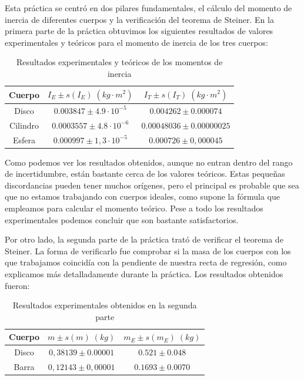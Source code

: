 \documentclass[a4paper,12pt,titlepage]{report}
\begin{document}
Esta práctica se centró en dos pilares fundamentales, el cálculo del momento de inercia de diferentes cuerpos y la verificación del teorema de Steiner. En la primera parte de la práctica obtuvimos los siguientes resultados de valores experimentales y teóricos para el momento de inercia de los tres cuerpos:

\begin{table}[h!]
    \centering
    \begin{tabular}{|c|c|c|}
        \hline
        Cuerpo & $I_E \pm s(I_E) \; (kg \cdot m^2)$ & $I_T \pm s(I_T) \; (kg \cdot m^2)$  \\ \hline
        Disco &$0.003847 \pm 4.9 \cdot 10^{-5}$ & $0.004262 \pm 0.000074$ \\ \hline
        Cilindro & $0.0003557 \pm 4.8 \cdot 10^{-6}$ & $0.00048036 \pm 0.00000025$ \\ \hline 
        Esfera & $0.000997 \pm  1,3 \cdot 10^{-5}$ & $0.000726 \pm 0,000045$ \\ \hline
    \end{tabular}
    \caption{Resultados experimentales y teóricos de los momentos de inercia}
\end{table}

Como podemos ver los resultados obtenidos, aunque no entran dentro del rango de incertidumbre, están bastante cerca de los valores teóricos. Estas pequeñas discordancias pueden tener muchos orígenes, pero el principal es probable que sea que no estamos trabajando con cuerpos ideales, como supone la fórmula que empleamos para calcular el momento teórico. Pese a todo los resultados experimentales podemos concluir que son bastante satisfactorios.

\par Por otro lado, la segunda parte de la práctica trató de verificar el teorema de Steiner. La forma de verificarlo fue comprobar si la masa de los cuerpos con los que trabajamos coincidía con la pendiente de nuestra recta de regresión, como explicamos más detalladamente durante la práctica. Los resultados obtenidos fueron:

\begin{table}[h!]
    \centering
    \begin{tabular}{|c|c|c|}
        \hline
        Cuerpo & $m \pm s(m) \; (kg)$ & $m_E \pm s(m_E) \; (kg)$ \\ \hline
        Disco & $0,38139 \pm 0.00001$ & $0.521 \pm 0.048$ \\ \hline
        Barra & $0,12143 \pm 0,00001$ & $0.1693 \pm 0.0070$ \\ \hline
    \end{tabular}
    \caption{Resultados experimentales obtenidos en la segunda parte}
\end{table}
\end{document}
